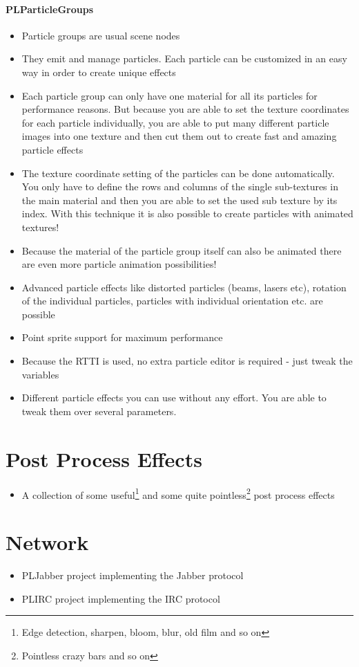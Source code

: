 \paragraph{PLParticleGroups}
\begin{itemize}
\item{Particle groups are usual scene nodes}
\item{They emit and manage particles. Each particle can be customized in an easy way in order to create unique effects}
\item{Each particle group can only have one material for all its particles for performance reasons. But because you are able to set the texture coordinates for each particle individually, you are able to put many different particle images into one texture and then cut them out to create fast and amazing particle effects}
\item{The texture coordinate setting of the particles can be done automatically. You only have to define the rows and columns of the single sub-textures in the main material and then you are able to set the used sub texture by its index. With this technique it is also possible to create particles with animated textures!}
\item{Because the material of the particle group itself can also be animated there are even more particle animation possibilities!}
\item{Advanced particle effects like distorted particles (beams, lasers etc), rotation of the individual particles, particles with individual orientation etc. are possible}
\item{Point sprite support for maximum performance}
\item{Because the RTTI is used, no extra particle editor is required - just tweak the variables}
\item{Different particle effects you can use without any effort. You are able to tweak them over several parameters.}
\end{itemize}




\section{Post Process Effects}
\begin{itemize}
\item{A collection of some useful\footnote{Edge detection, sharpen, bloom, blur, old film and so on} and some quite pointless\footnote{Pointless crazy bars and so on} post process effects}
\end{itemize}




\section{Network}
\begin{itemize}
\item{PLJabber project implementing the Jabber protocol}
\item{PLIRC project implementing the IRC protocol}
\end{itemize}
